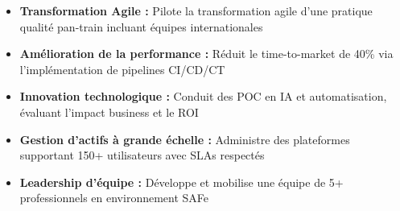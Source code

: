 \documentclass[11pt,a4paper]{article}
\newcommand{\highlight}[1]{\textcolor{primaryblue}{\textbf{#1}}}
\begin{document}
\begin{itemize}[leftmargin=10pt]
    \item \highlight{Transformation Agile :} Pilote la transformation agile d'une pratique qualité pan-train incluant équipes internationales
    \item \highlight{Amélioration de la performance :} Réduit le time-to-market de 40\% via l'implémentation de pipelines CI/CD/CT
    \item \highlight{Innovation technologique :} Conduit des POC en IA et automatisation, évaluant l'impact business et le ROI
    \item \highlight{Gestion d'actifs à grande échelle :} Administre des plateformes supportant 150+ utilisateurs avec SLAs respectés
    \item \highlight{Leadership d'équipe :} Développe et mobilise une équipe de 5+ professionnels en environnement SAFe
\end{itemize}
\end{document}
